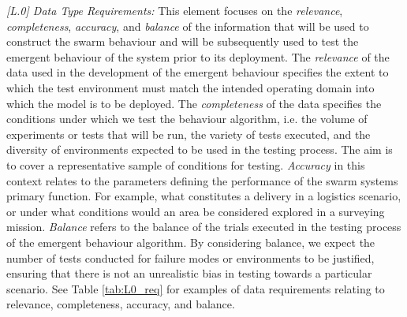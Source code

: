 \documentclass[runningheads]{llncs}
\begin{document}
\emph{[L.0] Data Type Requirements:}
This element focuses on the \emph{relevance}, \emph{completeness}, \emph{accuracy}, and \emph{balance} of the information that will be used to construct the swarm behaviour and will be subsequently used to test the emergent behaviour of the system prior to its deployment. The \emph{relevance} of the data used in the development of the emergent behaviour specifies the extent to which the test environment must match the intended operating domain into which the model is to be deployed. The \emph{completeness} of the data specifies the conditions under which we test the behaviour algorithm, i.e. the volume of experiments or tests that will be run, the variety of tests executed, and the diversity of environments expected to be used in the testing process. The aim is to cover a representative sample of conditions for testing. \emph{Accuracy} in this context relates to the parameters defining the performance of the swarm systems primary function. For example, what constitutes a delivery in a logistics scenario, or under what conditions would an area be considered explored in a surveying mission. \emph{Balance} refers to the balance of the trials executed in the testing process of the emergent behaviour algorithm. By considering balance, we expect the number of tests conducted for failure modes or environments to be justified, ensuring that there is not an unrealistic bias in testing towards a particular scenario. See Table \ref{tab:L0_req} for examples of data requirements relating to relevance, completeness, accuracy, and balance.

\end{document}
